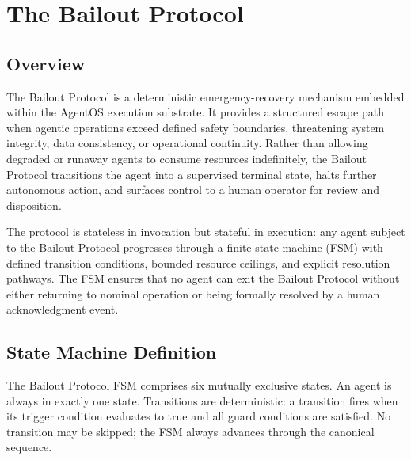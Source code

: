 \section{The Bailout Protocol}

\subsection{Overview}

The Bailout Protocol is a deterministic emergency-recovery mechanism embedded within the AgentOS execution substrate. It provides a structured escape path when agentic operations exceed defined safety boundaries, threatening system integrity, data consistency, or operational continuity. Rather than allowing degraded or runaway agents to consume resources indefinitely, the Bailout Protocol transitions the agent into a supervised terminal state, halts further autonomous action, and surfaces control to a human operator for review and disposition.

The protocol is stateless in invocation but stateful in execution: any agent subject to the Bailout Protocol progresses through a finite state machine (FSM) with defined transition conditions, bounded resource ceilings, and explicit resolution pathways. The FSM ensures that no agent can exit the Bailout Protocol without either returning to nominal operation or being formally resolved by a human acknowledgment event.

\subsection{State Machine Definition}

The Bailout Protocol FSM comprises six mutually exclusive states. An agent is always in exactly one state. Transitions are deterministic: a transition fires when its trigger condition evaluates to true and all guard conditions are satisfied. No transition may be skipped; the FSM always advances through the canonical sequence.


